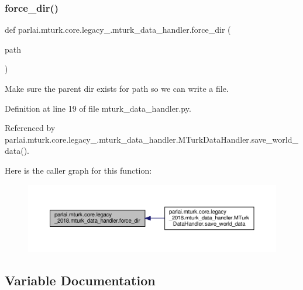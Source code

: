 \subsubsection{\texorpdfstring{force\+\_\+dir()}{force\_dir()}}
{\footnotesize\ttfamily def parlai.\+mturk.\+core.\+legacy\+\_.\+mturk\+\_\+data\+\_\+handler.\+force\+\_\+dir (\begin{DoxyParamCaption}\item[{}]{path }\end{DoxyParamCaption})}

\begin{DoxyVerb}Make sure the parent dir exists for path so we can write a file.\end{DoxyVerb}
 

Definition at line 19 of file mturk\+\_\+data\+\_\+handler.\+py.



Referenced by parlai.\+mturk.\+core.\+legacy\+\_.\+mturk\+\_\+data\+\_\+handler.\+M\+Turk\+Data\+Handler.\+save\+\_\+world\+\_\+data().

Here is the caller graph for this function\+:
\nopagebreak
\begin{figure}[H]
\begin{center}
\leavevmode
\includegraphics[width=350pt]{namespaceparlai_1_1mturk_1_1core_1_1legacy__2018_1_1mturk__data__handler_af046a82aca024a0c9a5e1b30a10fd921_icgraph}
\end{center}
\end{figure}


\subsection{Variable Documentation}
\mbox{\label{namespaceparlai_1_1mturk_1_1core_1_1legacy__2018_1_1mturk__data__handler_a121789130aa54c4d2b065f195ff83466}} 
